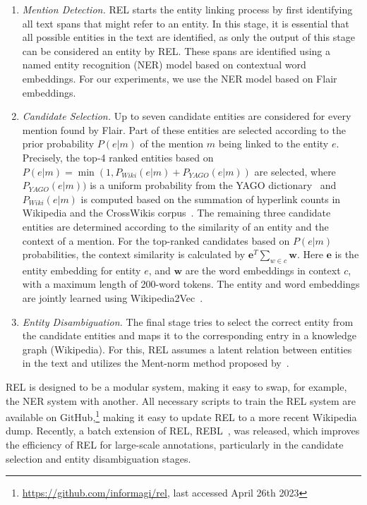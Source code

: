 \begin{enumerate}
	\item \emph{Mention Detection.} REL starts the entity linking process by first identifying all text spans that might refer to an entity. In this stage, it is essential that all possible entities in the text are identified, as only the output of this stage can be considered an entity by REL. These spans are identified using a named entity recognition (NER) model based on contextual word embeddings. For our experiments, we use the NER model based on Flair embeddings. 
	\item \emph{Candidate Selection.} Up to seven candidate entities are considered for every mention found by Flair. Part of these entities are selected according to the prior probability $P(e|m)$ of the mention $m$ being linked to the entity $e$. Precisely, the top-4 ranked entities based on $P(e|m) = \min(1, P_{\mathit{Wiki}}(e|m) + P_{\mathit{YAGO}}(e|m))$ are selected, where $P_{\mathit{YAGO}}(e|m))$ is a uniform probability from the YAGO dictionary~\citep{yago} and $P_{\mathit{Wiki}}(e|m)$ is computed based on the summation of hyperlink counts in Wikipedia and the CrossWikis corpus~\citep{crosswiki}.
	The remaining three candidate entities are determined according to the similarity of an entity and the context of a mention. For the top-ranked candidates based on $P(e|m)$ probabilities, the context similarity is calculated by $\mathbf{e}^T \sum_{w\in c}\mathbf{w}$. Here $\mathbf{e}$ is the entity embedding for entity $e$, and $\mathbf{w}$ are the word embeddings in context $c$, with a maximum length of 200-word tokens. The entity and word embeddings are jointly learned using Wikipedia2Vec~\citep{wikipedia2vec}. 
	\item \emph{Entity Disambiguation.} The final stage tries to select the correct entity from the candidate entities and maps it to the corresponding entry in a knowledge graph (Wikipedia). For this, REL assumes a latent relation between entities in the text and utilizes the Ment-norm method proposed by~\citet{ED-paper}.
\end{enumerate}

REL is designed to be a modular system, making it easy to swap, for example, the NER system with another. All necessary scripts to train the REL system are available on GitHub,\footnote{\url{https://github.com/informagi/rel}, last accessed April 26th 2023} making it easy to update REL to a more recent Wikipedia dump. Recently, a batch extension of REL, REBL~\citep{rebl}, was released, which improves the efficiency of REL for large-scale annotations, particularly in the candidate selection and entity disambiguation stages.  


